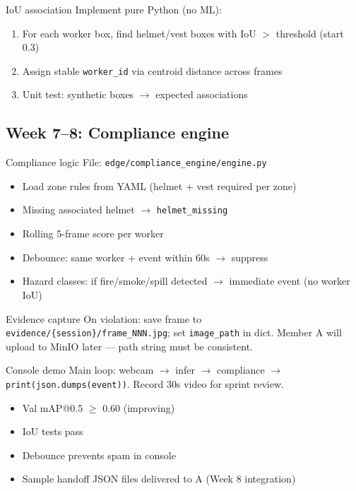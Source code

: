 \documentclass[12pt,a4paper]{report}
\begin{document}
\begin{stepbox}{IoU association}
Implement pure Python (no ML):
\begin{enumerate}
    \item For each worker box, find helmet/vest boxes with IoU $>$ threshold (start 0.3)
    \item Assign stable \texttt{worker\_id} via centroid distance across frames
    \item Unit test: synthetic boxes $\rightarrow$ expected associations
\end{enumerate}
\end{stepbox}

\subsection{Week 7--8: Compliance engine}

\begin{stepbox}{Compliance logic}
File: \texttt{edge/compliance\_engine/engine.py}
\begin{itemize}
    \item Load zone rules from YAML (helmet + vest required per zone)
    \item Missing associated helmet $\rightarrow$ \texttt{helmet\_missing}
    \item Rolling 5-frame score per worker
    \item Debounce: same worker + event within 60s $\rightarrow$ suppress
    \item Hazard classes: if fire/smoke/spill detected $\rightarrow$ immediate event (no worker IoU)
\end{itemize}
\end{stepbox}

\begin{stepbox}{Evidence capture}
On violation: save frame to \texttt{evidence/\{session\}/frame\_NNN.jpg}; set \texttt{image\_path} in dict. Member A will upload to MinIO later --- path string must be consistent.
\end{stepbox}

\begin{stepbox}{Console demo}
Main loop: webcam $\rightarrow$ infer $\rightarrow$ compliance $\rightarrow$ \texttt{print(json.dumps(event))}. Record 30s video for sprint review.
\end{stepbox}

\begin{verifybox}
\begin{itemize}
    \item[$\square$] Val mAP@0.5 $\geq$ 0.60 (improving)
    \item[$\square$] IoU tests pass
    \item[$\square$] Debounce prevents spam in console
    \item[$\square$] Sample handoff JSON files delivered to A (Week 8 integration)
\end{itemize}
\end{verifybox}
\end{document}
